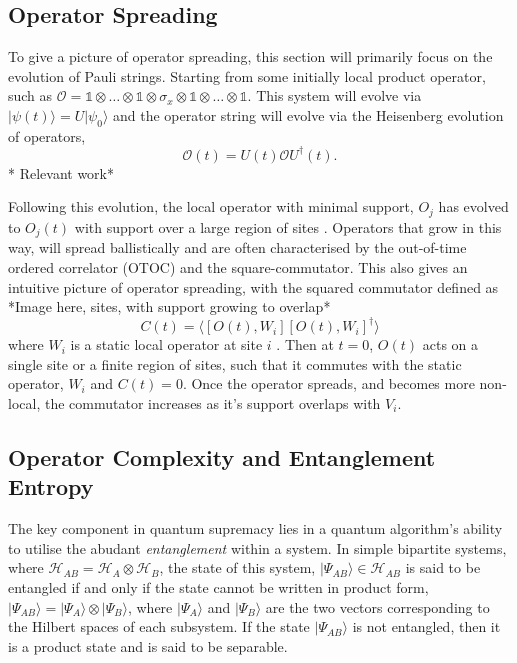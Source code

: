 \subsection{Operator Spreading} 
To give a picture of operator spreading, this section will primarily focus on the evolution of Pauli strings. Starting from some initially local product operator, such as 
$\mathcal{O} = \mathbb{1} \otimes\dots \otimes \mathbb{1} \otimes \sigma_{x} \otimes \mathbb{1} \otimes \dots \otimes \mathbb{1}$. This system will evolve via $|\psi (t)\rangle = U |\psi_0\rangle$ and the operator string will evolve via the Heisenberg evolution of operators, 
\begin{equation}\label{heisenberg_evolution}
    \mathcal{O}(t) = U(t) \mathcal{O} U^{\dagger}(t).
\end{equation}
 * Relevant work* 

 Following this evolution, the local operator with minimal support, $O_j$ has evolved to $O_j(t)$ with support over a
large region of sites \cite{Khemani_2018}. Operators that grow in this way, will spread ballistically \cite{Roberts_2015, Lieb:1972wy, Schuster_2022} and are often
characterised by the out-of-time ordered correlator (OTOC) \cite{Xu2022} and the square-commutator\cite{Blake_2018}. This also gives an
intuitive picture of operator spreading, with the squared commutator defined as *Image here, sites, with support growing to overlap* 
\begin{equation}
  C(t) = \langle [O(t), W_i][O(t), W_i]^{\dagger}\rangle
\end{equation}
where $W_i$ is a static local operator at site $i$ \cite{https://doi.org/10.48550/arxiv.1804.08655}. Then at $t=0$, $O(t)$
acts on a single site or a finite region of sites, such that it commutes with the static operator, $W_i$ and $C(t) = 0$.
Once the operator spreads, and becomes more non-local, the commutator increases as it's support overlaps with $V_i$.


\subsection{Operator Complexity and Entanglement Entropy}
The key component in quantum supremacy lies in a quantum algorithm's ability to utilise the abudant \textit{entanglement} within a system. In simple bipartite systems, where $\mathcal{H}_{AB} = \mathcal{H}_{A}\otimes \mathcal{H}_{B}$, the state of this system, $|\Psi_{AB}\rangle \in \mathcal{H}_{AB}$ is 
said to be entangled if and only if the state cannot be written in product form, $|\Psi_{AB}\rangle =  |\Psi_{A}\rangle \otimes |\Psi_{B}\rangle$, where $|\Psi_{A}\rangle$ and $|\Psi_{B}\rangle$ are the two vectors corresponding to the Hilbert spaces of each subsystem. If the state $|\Psi_{AB}\rangle$ is not entangled, then it is a product state and is said to be separable.


